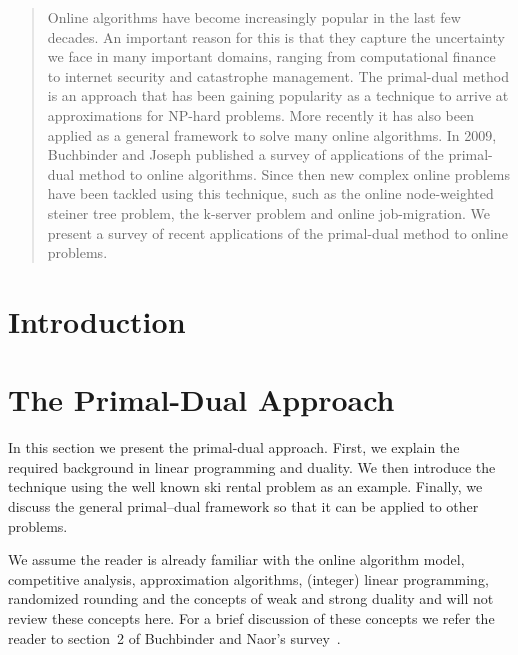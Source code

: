 \documentclass[10pt, twocolumn]{article}
\begin{document}
\maketitle

\begin{abstract}
Online algorithms have become increasingly popular in the last few decades.
An important reason for this is that they capture the uncertainty we face in many important domains, ranging from computational finance to internet security and catastrophe management.
The primal-dual method is an approach that has been gaining popularity as a technique to arrive at approximations for NP-hard problems.
More recently it has also been applied as a general framework to solve many online algorithms.
In 2009, Buchbinder and Joseph published a survey of applications of the primal-dual method to online algorithms.
Since then new complex online problems have been tackled using this technique, such as the online node-weighted steiner tree problem, the k-server problem and online job-migration.
We present a survey of recent applications of the primal-dual method to online problems.
\end{abstract}

\section{Introduction}




\section{The Primal-Dual Approach}

In this section we present the primal-dual approach.
First, we explain the required background in linear programming and duality.
We then introduce the technique using the well known ski rental problem as an example.
Finally, we discuss the general primal--dual framework so that it can be applied to other problems.

We assume the reader is already familiar with the online algorithm model, competitive analysis, approximation algorithms, (integer) linear programming, randomized rounding and the concepts of weak and strong duality and will not review these concepts here.
For a brief discussion of these concepts we refer the reader to section~2 of Buchbinder and Naor's survey~\cite{buchbinder09:survey}.



\end{document}
